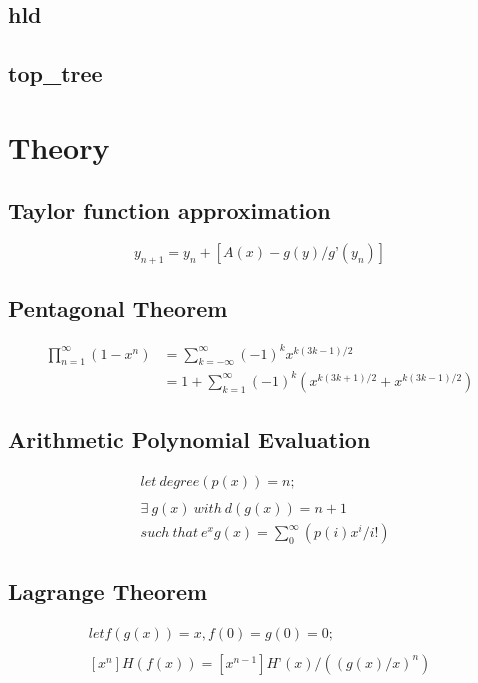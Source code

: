 \documentclass[a4paper, twocolumn]{article}
\begin{document}
\subsection{hld}

\subsection{top\_tree}

\section{Theory}
\subsection{Taylor function approximation}
    \[ y_{n+1} = y_n+[{A(x)-g(y)}/g’(y_n)] \]
\subsection{Pentagonal Theorem}
    \begin{align*}
        \prod _{n=1}^{\infty }\left(1-x^{n}\right) 
            &= \sum _{k=-\infty }^{\infty }
                \left(-1\right)^{k}x^{k\left(3k-1\right)/2} \\
            &= 1+\sum _{k=1}^{\infty }(-1)^{k}
                \left(x^{k(3k+1)/2}+x^{k(3k-1)/2}\right)
    \end{align*}

\subsection{Arithmetic Polynomial Evaluation}
    \begin{align*}
        & let \ degree(p(x)) = n; \\ \\
        & \exists \ g(x) \ with \ d(g(x)) = n+1 \\ 
        & such \ that \ e^x g(x) = \sum_{0}^{\infty} (p(i)x^i/i!)
    \end{align*}

\subsection{Lagrange Theorem}
    \begin{gather*}
        let f(g(x)) = x, f(0)=g(0)=0; \\ \\
            [x^n]H(f(x)) = [x^{n-1}] H’(x)/((g(x)/x)^n)
    \end{gather*}
\end{document}
